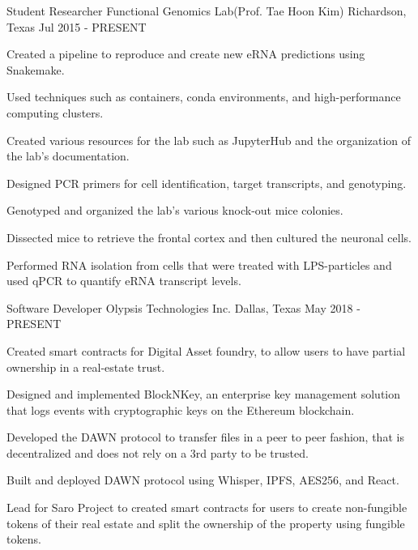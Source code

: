 

\begin{cventries}

	\cventry
	{Student Researcher} %
	{Functional Genomics Lab(Prof. Tae Hoon Kim)} %
	{Richardson, Texas} %
	{Jul 2015 - PRESENT} %
	{
		\begin{cvitems} %
			\item {Created a pipeline to reproduce and create new eRNA
					predictions using Snakemake.}
			\item {Used techniques such as containers, conda environments, and
					high-performance computing clusters.}
			\item {Created various resources for the lab such as JupyterHub
					and the organization of the lab's documentation.}
			\item {Designed PCR primers for cell identification, target transcripts, and genotyping.}
			\item {Genotyped and organized the lab's various knock-out mice colonies.}
			\item {Dissected mice to retrieve the frontal cortex and then cultured the neuronal cells.}
			\item {Performed RNA isolation from cells that were treated with LPS-particles and used qPCR to quantify eRNA transcript levels.}
		\end{cvitems}
	}

	\cventry
	{Software Developer} %
	{Olypsis Technologies Inc.} %
	{Dallas, Texas} %
	{May 2018 - PRESENT} %
	{
		\begin{cvitems} %
			\item {Created smart contracts for Digital Asset foundry, to allow
					users to have partial ownership in a real-estate trust.}
			\item {Designed and implemented BlockNKey, an enterprise key management solution
					that logs events with cryptographic keys on the Ethereum blockchain.}
			\item {Developed the DAWN protocol to transfer files in a peer to peer fashion, that is decentralized and does not rely on a 3rd party to be trusted.}
			\item {Built and deployed DAWN protocol using Whisper, IPFS, AES256, and React.}
			\item {Lead for Saro Project to created smart contracts for users to create non-fungible tokens of their real estate and split the ownership of the property using fungible tokens.}
		\end{cvitems}
	}


\end{cventries}
